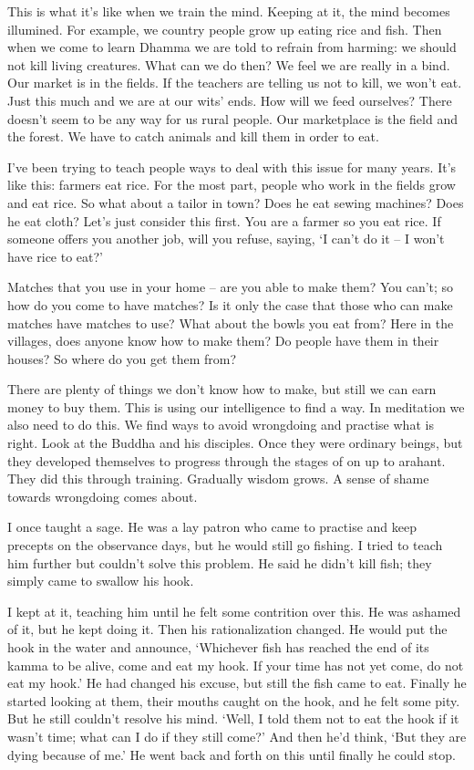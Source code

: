 This is what it's like when we train the mind. Keeping at it, the mind becomes illumined. For example, we country people grow up eating rice and fish. Then when we come to learn Dhamma we are told to refrain from harming: we should not kill living creatures. What can we do then? We feel we are really in a bind. Our market is in the fields. If the teachers are telling us not to kill, we won't eat. Just this much and we are at our wits' ends. How will we feed ourselves? There doesn't seem to be any way for us rural people. Our marketplace is the field and the forest. We have to catch animals and kill them in order to eat. 

I've been trying to teach people ways to deal with this issue for many years. It's like this: farmers eat rice. For the most part, people who work in the fields grow and eat rice. So what about a tailor in town? Does he eat sewing machines? Does he eat cloth? Let's just consider this first. You are a farmer so you eat rice. If someone offers you another job, will you refuse, saying, `I can't do it -- I won't have rice to eat?' 

Matches that you use in your home -- are you able to make them? You can't; so how do you come to have matches? Is it only the case that those who can make matches have matches to use? What about the bowls you eat from? Here in the villages, does anyone know how to make them? Do people have them in their houses? So where do you get them from? 

There are plenty of things we don't know how to make, but still we can earn money to buy them. This is using our intelligence to find a way. In meditation we also need to do this. We find ways to avoid wrongdoing and practise what is right. Look at the Buddha and his disciples. Once they were ordinary beings, but they developed themselves to progress through the stages of  on up to arahant. They did this through training. Gradually wisdom grows. A sense of shame towards wrongdoing comes about. 

I once taught a sage. He was a lay patron who came to practise and keep precepts on the observance days, but he would still go fishing. I tried to teach him further but couldn't solve this problem. He said he didn't kill fish; they simply came to swallow his hook. 

I kept at it, teaching him until he felt some contrition over this. He was ashamed of it, but he kept doing it. Then his rationalization changed. He would put the hook in the water and announce, `Whichever fish has reached the end of its kamma to be alive, come and eat my hook. If your time has not yet come, do not eat my hook.' He had changed his excuse, but still the fish came to eat. Finally he started looking at them, their mouths caught on the hook, and he felt some pity. But he still couldn't resolve his mind. `Well, I told them not to eat the hook if it wasn't time; what can I do if they still come?' And then he'd think, `But they are dying because of me.' He went back and forth on this until finally he could stop. 

